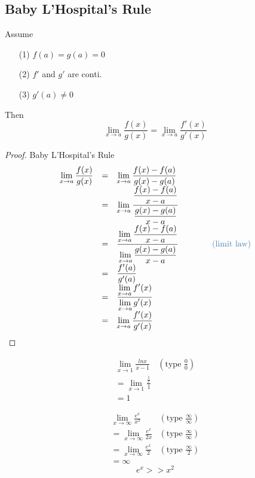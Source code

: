 \subsection*{Baby L'Hospital's Rule}
\begin{theorem}
Assume 
\begin{itemize}
\item[(1)] $f(a) = g(a) =0$
\item[(2)] $f'$ and $g'$ are conti.
\item[(3)] $g'(a) \neq 0$
\end{itemize}
Then
$$\displaystyle \lim_{x\to a} \frac{f(x)}{g(x)} = \lim_{x\to a} \frac{f'(x)}{g'(x)}$$
\end{theorem}
\begin{proof} Baby L'Hospital's Rule\\
$$\begin{array}{rcl}
\displaystyle \lim_{x\to a} \frac{f(x)}{g(x)} & = & \displaystyle  \lim_{x\to a} \frac{f(x)-f(a)}{g(x)-g(a)}\\
& = & \displaystyle \lim_{x\to a} \frac{\displaystyle \frac{f(x) - f(a)}{x-a}}{\displaystyle \frac{g(x) -g(a)}{x-a}}\\
& = & \displaystyle \frac{\displaystyle \lim_{x\to a} \frac{f(x) -f(a)}{x-a}}{\displaystyle \lim_{x\to a} \frac{g(x) -g(a)}{x-a}} \qquad \qquad \text{\tssteelblue{(limit law)}} \\
& = & \displaystyle \frac{f'(a)}{g'(a)}\\
& = & \displaystyle \frac{\displaystyle \lim_{x\to a} f'(x)}{\displaystyle \lim_{x\to a} g'(x)}\\
& = & \displaystyle \lim_{x\to a} \frac{f'(x)}{g'(x)}
\end{array}$$
\end{proof}
\begin{eg}
$$\begin{array}{ll}
\displaystyle \lim_{x\to 1} \frac{ln x}{x-1} & (\text{type } \displaystyle \frac{0}{0})\\
= \displaystyle \lim_{x\to 1} \frac{\frac{1}{x}}{1}\\
= 1
\end{array}$$
\end{eg}
\begin{eg}
$$\begin{array}{ll}
\displaystyle \lim_{x\to \infty} \frac{e^x}{x^2} & (\text{type } \displaystyle \frac{\infty}{\infty})\\
\displaystyle = \lim_{x\to \infty} \frac{e^x}{2x} & (\text{type } \displaystyle \frac{\infty}{\infty})\\
\displaystyle = \lim_{x\to \infty} \frac{e^x}{2} & (\text{type } \displaystyle \frac{\infty}{2})\\
= \infty
\end{array}$$
$$e^x >> x^2$$
\end{eg}
